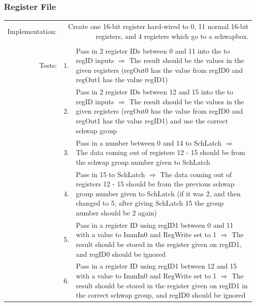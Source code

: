 \documentclass{article}
\begin{document}
		\subsubsection{Register File}
			\begin{tabular}{ r  r  p{12cm} }
				Implementation: & \multicolumn{2}{p{12.75cm}}{Create one 16-bit register hard-wired to 0, 11 normal 16-bit registers, and 4 registers which go to a schwapbox.}\\
				                &    & \\
				         Tests: & 1. & Pass in 2 register IDs between 0 and 11 into the to regID inputs $\Rightarrow$ The result should be the values in the given registers (regOut0 has the value from regID0 and regOut1 has the value regID1)\\
				                & 2. & Pass in 2 register IDs between 12 and 15 into the to regID inputs $\Rightarrow$ The result should be the values in the given registers (regOut0 has the value from regID0 and regOut1 has the value regID1) and use the correct schwap group\\
				                & 3. & Pass in a number between 0 and 14 to SchLatch $\Rightarrow$ The data coming out of registers 12 - 15 should be from the schwap group number given to SchLatch\\
				                & 4. & Pass in 15 to SchLatch $\Rightarrow$ The data coming out of registers 12 - 15 should be from the previous schwap group number given to SchLatch (if it was 2, and then changed to 5, after giving SchLatch 15 the group number should be 2 again) \\
				                & 5. & Pass in a register ID using regID1 between 0 and 11 with a value to ImmIn0 and RegWrite set to 1 $\Rightarrow$ The result should be stored in the register given on regID1, and regID0 should be ignored\\
				                & 6. & Pass in a register ID using regID1 between 12 and 15 with a value to ImmIn0 and RegWrite set to 1 $\Rightarrow$ The result should be stored in the register given on regID1 in the correct schwap group, and regID0 should be ignored\\
			\end{tabular}
\end{document}
